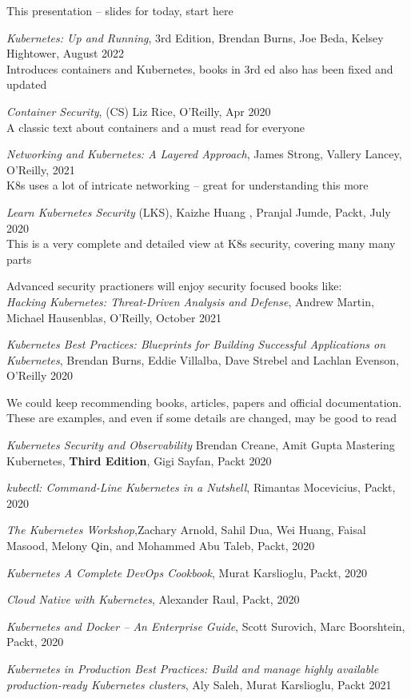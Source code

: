 \documentclass[Screen16to9,17pt]{foils}
\begin{document}
\begin{list2}
\item This presentation -- slides for today, start here
\item \emph{Kubernetes: Up and Running}, 3rd Edition, Brendan Burns, Joe Beda, Kelsey Hightower,
August 2022\\
Introduces containers and Kubernetes, books in 3rd ed also has been fixed and updated
\item \emph{Container Security}, (CS) Liz Rice, O'Reilly, Apr 2020\\
A classic text about containers and a must read for everyone
\item \emph{Networking and Kubernetes: A Layered Approach}, James Strong, Vallery Lancey, O'Reilly, 2021\\
K8s uses a lot of intricate networking -- great for understanding this more
\item \emph{Learn Kubernetes Security} (LKS), Kaizhe Huang , Pranjal Jumde, Packt, July 2020\\
This is a very complete and detailed view at K8s security, covering many many parts
\item Advanced security practioners will enjoy security focused books like:\\
\emph{Hacking Kubernetes: Threat-Driven Analysis and Defense}, Andrew Martin, Michael Hausenblas, O'Reilly, October 2021
\item \emph{Kubernetes Best Practices: Blueprints for Building Successful Applications on Kubernetes}, Brendan Burns, Eddie Villalba, Dave Strebel and Lachlan Evenson, O'Reilly 2020
\end{list2}



We could keep recommending books, articles, papers and official documentation.
These are examples, and even if some details are changed, may be good to read
\begin{list2}
\item \emph{Kubernetes Security and Observability} Brendan Creane, Amit Gupta %
Mastering Kubernetes, {\bf Third Edition}, Gigi Sayfan, Packt 2020
\item \emph{kubectl: Command-Line Kubernetes in a Nutshell}, Rimantas Mocevicius, Packt, 2020
\item \emph{The Kubernetes Workshop},Zachary Arnold, Sahil Dua, Wei Huang, Faisal Masood, Melony Qin,
and Mohammed Abu Taleb, Packt, 2020
\item \emph{Kubernetes A Complete DevOps Cookbook}, Murat Karslioglu, Packt, 2020
\item \emph{Cloud Native with Kubernetes}, Alexander Raul, Packt, 2020
\item \emph{Kubernetes and Docker – An Enterprise Guide}, Scott Surovich, Marc Boorshtein, Packt, 2020
\item \emph{Kubernetes in Production Best Practices: Build and manage highly available production-ready
Kubernetes clusters}, Aly Saleh, Murat Karslioglu, Packt 2021
\end{list2}
\end{document}

